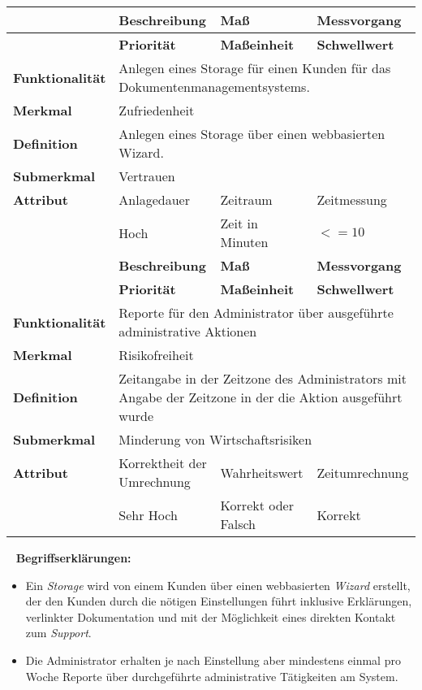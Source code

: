 \begin{tabularx}{\textwidth}{ p{70pt} | X | X | X }
	\hline
	& \textbf{Beschreibung} & \textbf{Maß} & \textbf{Messvorgang} \\ \hline
	& \textbf{Priorität} & \textbf{Maßeinheit} & \textbf{Schwellwert} \\ \hline
	\textbf{Funktionalität} & \multicolumn{3}{p{300pt}}{Anlegen eines Storage für einen Kunden für das Dokumentenmanagementsystems.} \\ \hline
	\textbf{Merkmal} & \multicolumn{3}{X}{Zufriedenheit} \\ \hline
	\textbf{Definition} & \multicolumn{3}{p{380pt}}{Anlegen eines Storage über einen webbasierten Wizard.} \\ \hline
	\textbf{Submerkmal} & \multicolumn{3}{X}{Vertrauen} \\ \hline 
	\textbf{Attribut} & Anlagedauer & Zeitraum & Zeitmessung \\ \hline
	& Hoch               & Zeit in Minuten & $<= 10$  \\ 
	\hline 
	\hline 
	& \textbf{Beschreibung} & \textbf{Maß} & \textbf{Messvorgang} \\ \hline
	& \textbf{Priorität} & \textbf{Maßeinheit} & \textbf{Schwellwert} \\ \hline
	\textbf{Funktionalität} & \multicolumn{3}{p{300pt}}{Reporte für den Administrator über ausgeführte administrative Aktionen} \\ \hline
	\textbf{Merkmal} & \multicolumn{3}{X}{Risikofreiheit} \\ \hline
	\textbf{Definition} & \multicolumn{3}{p{380pt}}{Zeitangabe in der Zeitzone des Administrators mit Angabe der Zeitzone in der die Aktion ausgeführt wurde} \\ \hline
	\textbf{Submerkmal} & \multicolumn{3}{p{380pt}}{Minderung von Wirtschaftsrisiken} \\ \hline 
	\textbf{Attribut} & Korrektheit der Umrechnung  & Wahrheitswert  & Zeitumrechnung  \\ \hline
	& Sehr Hoch               & Korrekt oder Falsch & Korrekt \\ \hline
\end{tabularx}
\egroup
\ \newline 
\newline
\textbf{Begriffserklärungen:}
\begin{itemize}
	\item Ein \emph{Storage} wird von einem Kunden über einen webbasierten \emph{Wizard} erstellt, der den Kunden durch die nötigen Einstellungen führt inklusive Erklärungen,  verlinkter Dokumentation und mit der Möglichkeit eines direkten Kontakt zum \emph{Support}.
	\item Die Administrator erhalten je nach Einstellung aber mindestens einmal pro Woche Reporte über durchgeführte administrative Tätigkeiten am System.
\end{itemize}



